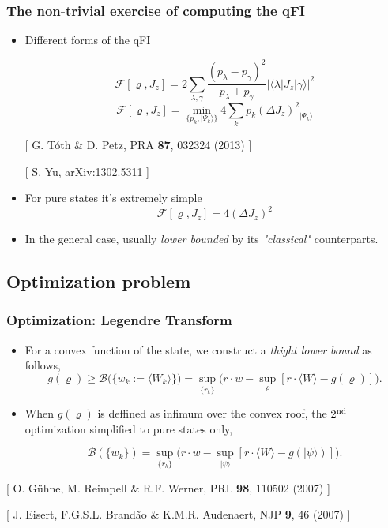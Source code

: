 \documentclass{beamer}
\newcommand{\ket}[1]{\ensuremath{\vert #1 \rangle}}
\newcommand{\braOket}[3]{\ensuremath{\langle #1 \vert #2 \vert #3 \rangle}}
\newcommand{\expect}[1]{\ensuremath{\langle #1 \rangle}}
\newcommand{\varian}[1]{\ensuremath{\left(\Delta #1 \right)^2}}
\newcommand{\citate}[1]{{\footnotesize{\color{gray}[ #1 ]}}

	}
\begin{document}
	\begin{frame}
		\tableofcontents[currentsection]

	\end{frame}

	\begin{frame}
		\frametitle{The non-trivial exercise of computing the qFI}

		\begin{itemize}
			\item<1-> Different forms of the qFI
				\begin{block}
					{}
					\small
					\[
						\mathcal{F}[\varrho,J_z]=2 \sum_{\lambda,\gamma} \frac{(p_\lambda-p_\gamma)^2}{p_\lambda+p_\gamma} |\braOket{\lambda}{J_z}{\gamma}|^2
					\]
					\[
					  \mathcal{F}[\varrho,J_z]=\min_{\{p_k,\ket{\Psi_k}\}} 4\sum_k p_k \varian{J_z}_{\ket{\Psi_k}}
					\]
				\end{block}

				\citate{G. T\'oth \& D. Petz, PRA {\bf 87}, 032324 (2013)}
				\citate{S. Yu, arXiv:1302.5311}

			\item<2-> For pure states it's extremely simple
				{\small
				\[
					\mathcal{F}[\varrho,J_z] = 4\varian{J_z}
				\]
				}
			\item<3-> In the general case, usually \emph{\color{blue} lower bounded} by its \emph{"classical"} counterparts.

		\end{itemize}

	\end{frame}

	\subsection{Optimization problem}

		\begin{frame}
			\frametitle{Optimization: Legendre Transform}
			\begin{itemize}
				\item For a convex function of the state, we construct a \emph{thight lower bound} as follows,
					{\small \[
					g(\varrho) \geq
					\mathcal{B} \big( \{w_k := \expect{W_k}\} \big) = \sup_{\{r_k\}} \big( r \cdot w - \sup_{\varrho} [ r\cdot\expect{W} - g(\varrho) ] \big).
					\]}
				\item When $g(\varrho)$ is deffined as infimum over the convex roof, the $2^{\rm nd}$ optimization simplified to pure states only,
					\begin{block}
						{}
						{\small
						\vspace{8px}
						\[
						\mathcal{B}(\{w_k\}) = \sup_{\{r_k\}} \big( r\cdot w - \sup_{\ket{\psi}} [ r\cdot\expect{W} - g(\ket{\psi}) ] \big).
						\]}
					\end{block}
			\end{itemize}

			\citate{O. G\"uhne, M. Reimpell \& R.F. Werner, PRL {\bf 98}, 110502 (2007)}
			\citate{J. Eisert, F.G.S.L. Brand\~ao \& K.M.R. Audenaert, NJP {\bf 9}, 46 (2007)}
		\end{frame}
\end{document}
